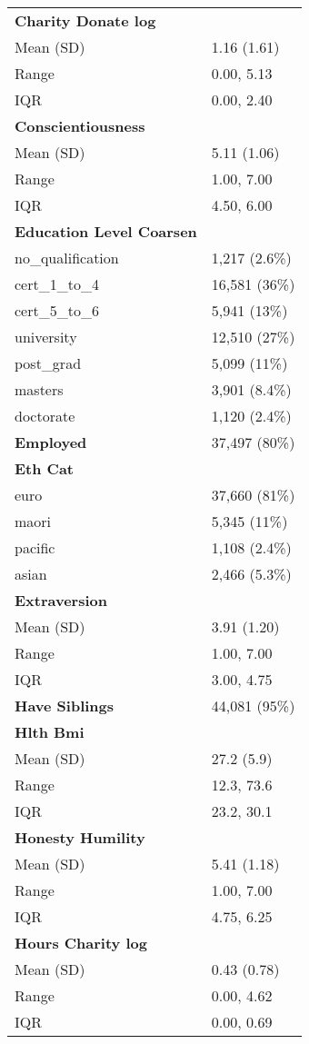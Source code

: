\documentclass[
  singlecolumn]{article}
\begin{document}
\begin{longtable}[]{@{}ll@{}}
\textbf{Charity Donate log} & \\
Mean (SD) & 1.16 (1.61) \\
Range & 0.00, 5.13 \\
IQR & 0.00, 2.40 \\
\textbf{Conscientiousness} & \\
Mean (SD) & 5.11 (1.06) \\
Range & 1.00, 7.00 \\
IQR & 4.50, 6.00 \\
\textbf{Education Level Coarsen} & \\
no\_qualification & 1,217 (2.6\%) \\
cert\_1\_to\_4 & 16,581 (36\%) \\
cert\_5\_to\_6 & 5,941 (13\%) \\
university & 12,510 (27\%) \\
post\_grad & 5,099 (11\%) \\
masters & 3,901 (8.4\%) \\
doctorate & 1,120 (2.4\%) \\
\textbf{Employed} & 37,497 (80\%) \\
\textbf{Eth Cat} & \\
euro & 37,660 (81\%) \\
maori & 5,345 (11\%) \\
pacific & 1,108 (2.4\%) \\
asian & 2,466 (5.3\%) \\
\textbf{Extraversion} & \\
Mean (SD) & 3.91 (1.20) \\
Range & 1.00, 7.00 \\
IQR & 3.00, 4.75 \\
\textbf{Have Siblings} & 44,081 (95\%) \\
\textbf{Hlth Bmi} & \\
Mean (SD) & 27.2 (5.9) \\
Range & 12.3, 73.6 \\
IQR & 23.2, 30.1 \\
\textbf{Honesty Humility} & \\
Mean (SD) & 5.41 (1.18) \\
Range & 1.00, 7.00 \\
IQR & 4.75, 6.25 \\
\textbf{Hours Charity log} & \\
Mean (SD) & 0.43 (0.78) \\
Range & 0.00, 4.62 \\
IQR & 0.00, 0.69 \\

\end{longtable}
\end{document}
